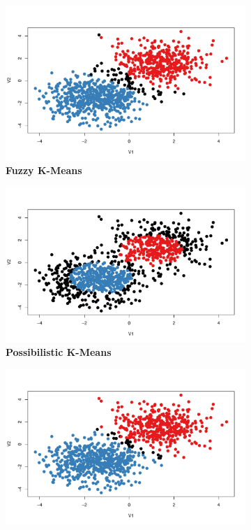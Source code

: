 \documentclass[12pt]{article}
\begin{document}
\begin{figure}[h]
	\centering
	\begin{subfigure}[h]{0.49\textwidth}
		\centering
		\includegraphics[width=\textwidth]{synth_fkm}
		\caption{\textbf{Fuzzy K-Means}}
		\label{fig:synth_fkm}
	\end{subfigure}
	\begin{subfigure}[h]{0.49\textwidth}
		\centering
		\includegraphics[width=\textwidth]{synth_pcm}
		\caption{\textbf{Possibilistic K-Means}}
		\label{fig:synth_pcm}
	\end{subfigure}
	\begin{subfigure}[h]{0.49\textwidth}
		\centering
		\includegraphics[width=\textwidth]{synth_mclust}

\end{subfigure}
\end{figure}
\end{document}
